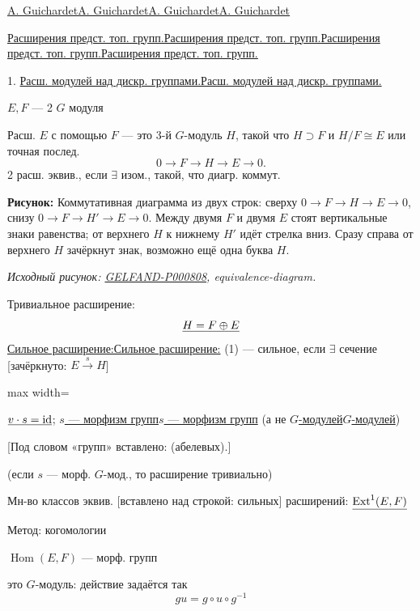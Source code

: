 \documentclass[11pt]{article}
\theoremstyle{definition}
\theoremstyle{remark}
\newcommand{\SourceFigure}[3]{%
  \par\begingroup\color{blue!60!black}\textbf{\hyperref[#1:source-page]{Source figure #1/#2}:} #3%
  \par\textit{Consult the authoritative scan at this locator.}\endgroup\par%
}
\renewcommand{\SourceFigure}[3]{%
  \par\begingroup\color{blue!55!black}\textbf{Рисунок:} #3%
  \par{\small\textit{Исходный рисунок: \hyperref[#1:source-page]{#1}, #2.}}%
  \endgroup\par%
}
\let\DiplomaticMathUnderline\underline
\renewcommand{\underline}[1]{\ifmmode\DiplomaticMathUnderline{#1}\else\uline{#1}\fi}
\begin{document}
\underline{\underline{A. Guichardet}}

\underline{\underline{Расширения предст. топ. групп.}}

1. \underline{Расш. модулей над дискр. группами.}

$E,F$ — 2 $G$ модуля

Расш. $E$ с помощью $F$ — это 3-й $G$-модуль $H$, такой что $H\supset F$ и
$H/F\cong E$ или точная послед.
\begin{equation*}
0\longrightarrow F\longrightarrow H\longrightarrow E\longrightarrow0.\tag{1}
\end{equation*}
2 расш. эквив., если $\exists$ изом., такой, что диагр. коммут.

\SourceFigure{GELFAND-P000808}{equivalence-diagram}{Коммутативная диаграмма из двух строк: сверху $0\to F\to H\to E\to0$, снизу $0\to F\to H'\to E\to0$. Между двумя $F$ и двумя $E$ стоят вертикальные знаки равенства; от верхнего $H$ к нижнему $H'$ идёт стрелка вниз. Сразу справа от верхнего $H$ зачёркнут знак, возможно ещё одна буква $H$.}

Тривиальное расширение:
\begin{equation*}
\underline{H=F\oplus E}
\end{equation*}
\underline{Сильное расширение:} (1) — сильное, если $\exists$ сечение
[зачёркнуто: $E\overset{s}{\longrightarrow}H$]

\begin{center}
\begin{adjustbox}{max width=\linewidth}
\end{adjustbox}
\end{center}

$\underline{v\cdot s=\mathrm{id}}$;
\underline{$s$ — морфизм групп} (а не \underline{$G$-модулей})

[Под словом «групп» вставлено: (абелевых).]

(если $s$ — морф. $G$-мод., то расширение тривиально)

Мн-во классов эквив. [вставлено над строкой: сильных] расширений:
$\underline{\operatorname{Ext}^1(E,F)}$

Метод: когомологии

$\operatorname{Hom}(E,F)$ — морф. групп

это $G$-модуль: действие задаётся так
\begin{equation*}
gu=g\circ u\circ g^{-1}
\end{equation*}
\end{document}
